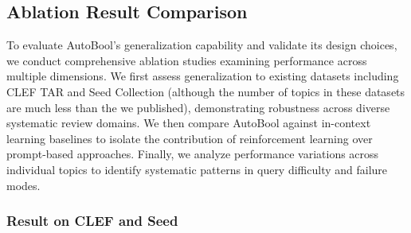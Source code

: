 

\subsection{Ablation Result Comparison}

To evaluate AutoBool's generalization capability and validate its design choices, we conduct comprehensive ablation studies examining performance across multiple dimensions. We first assess generalization to existing datasets including CLEF TAR and Seed Collection (although the number of topics in these datasets are much less than the we published), demonstrating robustness across diverse systematic review domains. We then compare AutoBool against in-context learning baselines to isolate the contribution of reinforcement learning over prompt-based approaches. Finally, we analyze performance variations across individual topics to identify systematic patterns in query difficulty and failure modes. 

\subsubsection{Result on CLEF and Seed}

